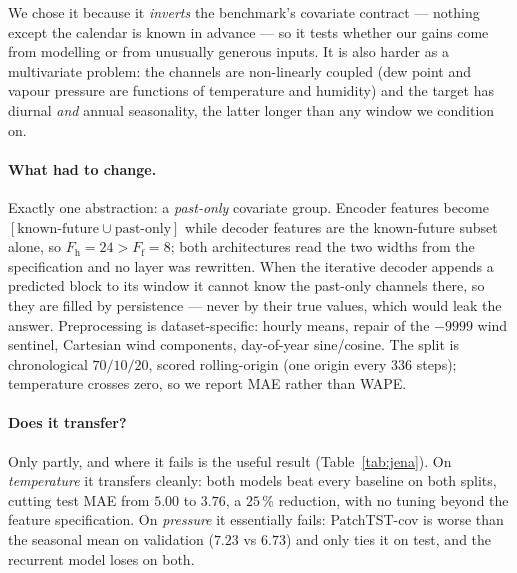 \documentclass[10pt,twocolumn]{article}
\begin{document}
We chose it because it \emph{inverts} the benchmark's covariate contract --- nothing
except the calendar is known in advance --- so it tests whether our gains come from
modelling or from unusually generous inputs. It is also harder as a multivariate
problem: the channels are non-linearly coupled (dew point and vapour pressure are
functions of temperature and humidity) and the target has diurnal \emph{and} annual
seasonality, the latter longer than any window we condition on.

\paragraph{What had to change.} Exactly one abstraction: a \emph{past-only}
covariate group. Encoder features become $[\text{known-future} \cup
\text{past-only}]$ while decoder features are the known-future subset alone, so
$F_{\mathrm{h}}=24 > F_{\mathrm{f}}=8$; both architectures read the two widths from
the specification and no layer was rewritten. When the iterative decoder appends a
predicted block to its window it cannot know the past-only channels there, so they
are filled by persistence --- never by their true values, which would leak the
answer. Preprocessing is dataset-specific: hourly means, repair of the $-9999$ wind
sentinel, Cartesian wind components, day-of-year sine/cosine. The split is
chronological $70/10/20$, scored rolling-origin (one origin every $336$ steps);
temperature crosses zero, so we report MAE rather than WAPE.

\begin{table}[t]
\centering
\caption{Jena Climate, hourly, $L=168$, $H=336$, rolling-origin evaluation.
Temperature crosses zero, so MAE replaces WAPE; RMSE is in
\texttt{results/jena.json}. Both targets use the same architecture and optimiser
settings as the benchmark, with a reduced epoch budget and no static or missingness
features; the calendar encodings are the only known-future covariates.}
\label{tab:jena}
\scriptsize
\setlength{\tabcolsep}{3pt}

\end{table}

\paragraph{Does it transfer?} Only partly, and where it fails is the useful result
(Table~\ref{tab:jena}). On \emph{temperature} it transfers cleanly: both models
beat every baseline on both splits, cutting test MAE from $5.00$ to $3.76$, a
$25$\,\% reduction, with no tuning beyond the feature specification. On
\emph{pressure} it essentially fails: PatchTST-cov is worse than the seasonal mean
on validation ($7.23$ vs $6.73$) and only ties it on test, and the recurrent model
loses on both.
\end{document}
